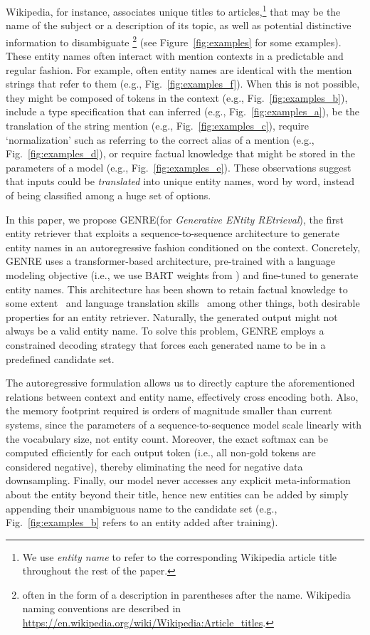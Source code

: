 \documentclass{article} \usepackage{main,times}
\makeatletter
\def\genre{\textsc{GENRE}\@\xspace}
\makeatother
\begin{document}
Wikipedia, for instance, associates unique titles to articles,\footnote{We use \textit{entity name} to refer to the corresponding Wikipedia article title throughout the rest of the paper.} that may be the name of the subject or a description of its topic, as well as potential distinctive information to disambiguate \footnote{often in the form of a description in parentheses after the name. Wikipedia naming conventions are described in  \url{https://en.wikipedia.org/wiki/Wikipedia:Article_titles}. } (see Figure~\ref{fig:examples} for some examples).
These entity names often interact with mention contexts in a predictable and regular fashion.
For example, often entity names are identical with the mention strings that refer to them (e.g., Fig.~\ref{fig:examples_f}). When this is not possible, they might be composed of tokens in the context (e.g., Fig.~\ref{fig:examples_b}), include a type specification that can inferred (e.g., Fig.~\ref{fig:examples_a}), be the translation of the string mention (e.g., Fig.~\ref{fig:examples_c}), require `normalization' such as referring to the correct alias of a mention (e.g., Fig.~\ref{fig:examples_d}), or require factual knowledge that might be stored in the parameters of a model (e.g., Fig.~\ref{fig:examples_e}). 
These observations suggest that inputs could be \emph{translated} into unique entity names, word by word, instead of being classified among a huge set of options.



In this paper, we propose \genre (for \textit{Generative ENtity REtrieval}),  the first entity retriever that exploits a sequence-to-sequence architecture to generate entity names in an autoregressive fashion conditioned on the context.
Concretely, \genre uses a transformer-based architecture, pre-trained with a language modeling objective (i.e., we use BART weights from \citet{lewis2019bart}) and fine-tuned to generate entity names. 
This architecture has been shown to retain factual knowledge to some extent~\citep{petroni-etal-2019-language} and language translation skills~\citep{Radford2019LanguageMA} among other things, both desirable properties for an entity retriever.
Naturally, the generated output might not always be a valid entity name. To solve this problem, \genre employs a constrained decoding strategy that forces each generated name to be in a predefined candidate set. 

The autoregressive formulation allows us to directly capture the aforementioned relations between context and entity name, effectively cross encoding both.
Also, the memory footprint required is orders of magnitude smaller than current systems, since the parameters of a sequence-to-sequence model scale linearly with the vocabulary size, not entity count.
Moreover, the exact softmax can be computed efficiently for each output token (i.e., all non-gold tokens are considered negative), thereby eliminating the need for negative data downsampling.
Finally, our model never accesses any explicit meta-information about the entity beyond their title, hence new entities can be added by simply appending their unambiguous name to the candidate set (e.g., Fig.~\ref{fig:examples_b} refers to an entity added after training).
\end{document}
